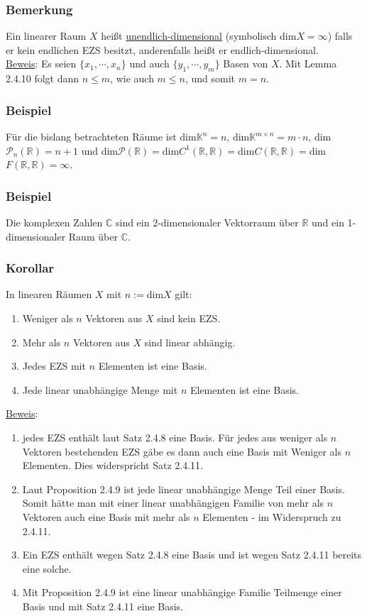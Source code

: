 \subsubsection{Bemerkung}
Ein linearer Raum $X$ heißt \underline{unendlich-dimensional} (symbolisch dim$X=\infty$) falls er kein endlichen EZS besitzt, anderenfalls heißt er endlich-dimensional.\\
\underline{Beweis}: Es seien $\{x_1,\cdots ,x_n\}$ und auch $\{y_1,\cdots ,y_m\}$ Basen von $X$.  Mit Lemma 2.4.10 folgt dann $n\leq m$, wie auch $m\leq n$, und somit $m=n$.
\subsubsection{Beispiel}
Für die bislang betrachteten Räume ist dim$\mathbb{K}^n=n$, dim$\mathbb{K}^{m\times n}=m\cdot n$, dim$\mathcal{P}_n(\mathbb{R})=n+1$ und dim$\mathcal{P}(\mathbb{R})=$dim$C^1(\mathbb{R},\mathbb{R})=$dim$C(\mathbb{R},\mathbb{R})=$dim$F(\mathbb{R},\mathbb{R})=\infty$.
\subsubsection{Beispiel}
Die komplexen Zahlen $\mathbb{C}$ sind ein 2-dimensionaler Vektorraum über $\mathbb{R}$ und ein 1-dimensionaler Raum über $\mathbb{C}$.
\subsubsection{Korollar}
In linearen Räumen $X$ mit $n:=$dim$X$ gilt:
\begin{enumerate}
\item Weniger als $n$ Vektoren aus $X$ sind kein EZS.
\item Mehr als $n$ Vektoren aus $X$ sind linear abhängig.
\item Jedes EZS mit $n$ Elementen ist eine Basis.
\item Jede linear unabhängige Menge mit $n$ Elementen ist eine Basis.
\end{enumerate}
\underline{Beweis}: 
\begin{enumerate}
\item jedes EZS enthält laut Satz 2.4.8 eine Basis.  Für jedes aus weniger als $n$ Vektoren bestehenden EZS gäbe es dann auch eine Basis mit Weniger als $n$ Elementen.  Dies widerspricht Satz 2.4.11.
\item Laut Proposition 2.4.9 ist jede linear unabhängige Menge Teil einer Basis.  Somit hätte man mit einer linear unabhängigen Familie von mehr als $n$ Vektoren auch eine Basis mit mehr als $n$ Elementen - im Widerspruch zu 2.4.11.
\item Ein EZS enthält wegen Satz 2.4.8 eine Basis und ist wegen Satz 2.4.11 bereits eine solche.
\item Mit Proposition 2.4.9 ist eine linear unabhängige Familie Teilmenge einer Basis und mit Satz 2.4.11 eine Basis.
\end{enumerate}
